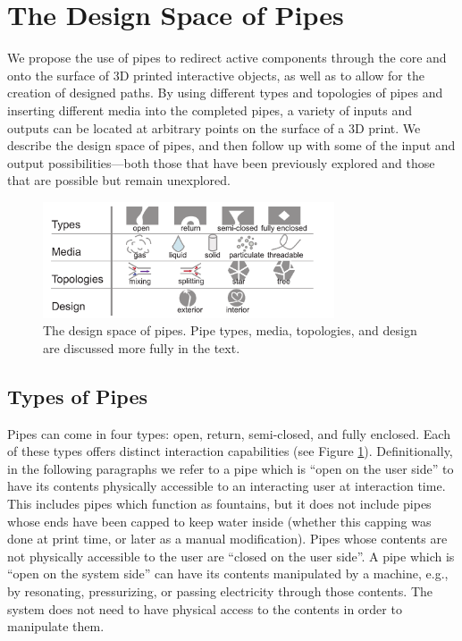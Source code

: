 \section{The Design Space of Pipes}
We propose the use of pipes to redirect active components through the core and onto the surface of 3D printed interactive objects, as well as to allow for the creation of designed paths.  By using different types and topologies of pipes and inserting different media into the completed pipes, a variety of inputs and outputs can be located at arbitrary points on the surface of a 3D print.  We describe the design space of pipes, and then follow up with some of the input and output possibilities---both those that have been previously explored and those that are possible but remain unexplored.

\begin{figure}[h]
\centering
    \includegraphics[width=3.4in]{figures/tubespace.pdf}
\caption{The design space of pipes.  Pipe types, media, topologies, and design are discussed more fully in the text.}
\label{fig:pipespace}
\end{figure}

\subsection{Types of Pipes}

Pipes can come in four types: open, return, semi-closed, and fully enclosed.  Each of these types offers distinct interaction capabilities (see Figure \ref{fig:pipespace}).  Definitionally, in the following paragraphs we refer to a pipe which is ``open on the user side'' to have its contents physically accessible to an interacting user at interaction time.  This includes pipes which function as fountains, but it does not include pipes whose ends have been capped to keep water inside (whether this capping was done at print time, or later as a manual modification).  Pipes whose contents are not physically accessible to the user are ``closed on the user side''.  A pipe which is ``open on the system side'' can have its contents manipulated by a machine, e.g., by resonating, pressurizing, or passing electricity through those contents.  The system does not need to have physical access to the contents in order to manipulate them.

